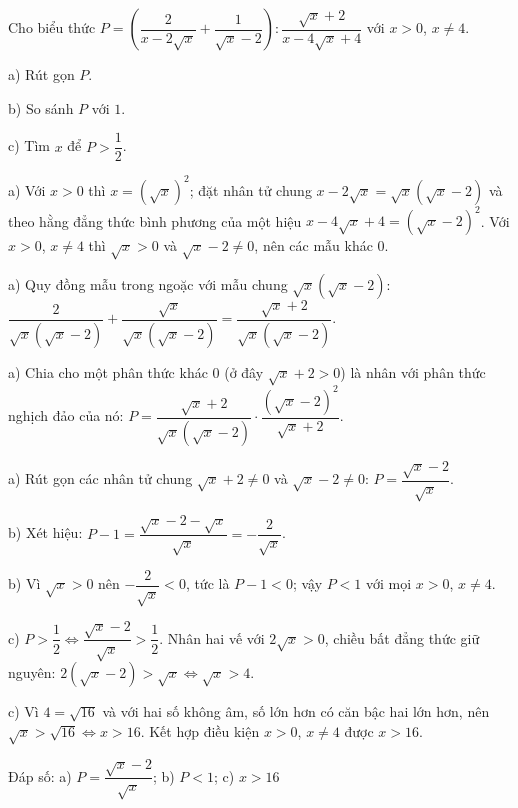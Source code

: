 \begin{problem}[9DS-CAN-018]
Cho biểu thức $P = \left(\dfrac{2}{x - 2\sqrt{x}} + \dfrac{1}{\sqrt{x} - 2}\right) : \dfrac{\sqrt{x} + 2}{x - 4\sqrt{x} + 4}$ với $x > 0$, $x \neq 4$.

a) Rút gọn $P$.

b) So sánh $P$ với $1$.

c) Tìm $x$ để $P > \dfrac{1}{2}$.

\begin{solution}
a) Với $x > 0$ thì $x = (\sqrt{x})^2$; đặt nhân tử chung $x - 2\sqrt{x} = \sqrt{x}(\sqrt{x} - 2)$ và theo hằng đẳng thức bình phương của một hiệu $x - 4\sqrt{x} + 4 = (\sqrt{x} - 2)^2$. Với $x > 0$, $x \neq 4$ thì $\sqrt{x} > 0$ và $\sqrt{x} - 2 \neq 0$, nên các mẫu khác $0$.

a) Quy đồng mẫu trong ngoặc với mẫu chung $\sqrt{x}(\sqrt{x} - 2)$: $\dfrac{2}{\sqrt{x}(\sqrt{x} - 2)} + \dfrac{\sqrt{x}}{\sqrt{x}(\sqrt{x} - 2)} = \dfrac{\sqrt{x} + 2}{\sqrt{x}(\sqrt{x} - 2)}$.

a) Chia cho một phân thức khác $0$ (ở đây $\sqrt{x} + 2 > 0$) là nhân với phân thức nghịch đảo của nó: $P = \dfrac{\sqrt{x} + 2}{\sqrt{x}(\sqrt{x} - 2)} \cdot \dfrac{(\sqrt{x} - 2)^2}{\sqrt{x} + 2}$.

a) Rút gọn các nhân tử chung $\sqrt{x} + 2 \neq 0$ và $\sqrt{x} - 2 \neq 0$: $P = \dfrac{\sqrt{x} - 2}{\sqrt{x}}$.

b) Xét hiệu: $P - 1 = \dfrac{\sqrt{x} - 2 - \sqrt{x}}{\sqrt{x}} = -\dfrac{2}{\sqrt{x}}$.

b) Vì $\sqrt{x} > 0$ nên $-\dfrac{2}{\sqrt{x}} < 0$, tức là $P - 1 < 0$; vậy $P < 1$ với mọi $x > 0$, $x \neq 4$.

c) $P > \dfrac{1}{2} \Leftrightarrow \dfrac{\sqrt{x} - 2}{\sqrt{x}} > \dfrac{1}{2}$. Nhân hai vế với $2\sqrt{x} > 0$, chiều bất đẳng thức giữ nguyên: $2(\sqrt{x} - 2) > \sqrt{x} \Leftrightarrow \sqrt{x} > 4$.

c) Vì $4 = \sqrt{16}$ và với hai số không âm, số lớn hơn có căn bậc hai lớn hơn, nên $\sqrt{x} > \sqrt{16} \Leftrightarrow x > 16$. Kết hợp điều kiện $x > 0$, $x \neq 4$ được $x > 16$.

Đáp số: a) $\boxed{P = \dfrac{\sqrt{x} - 2}{\sqrt{x}}}$; b) $\boxed{P < 1}$; c) $\boxed{x > 16}$
\end{solution}
\end{problem}

